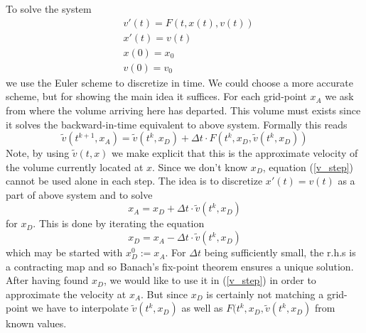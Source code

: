 \documentclass[17pt]{extarticle}
\begin{document}
To solve the system
\begin{align*}
	&v'(t)=F(t,x(t),v(t))\\
	&x'(t)=v(t)\\
	&x(0)=x_0\\
	&v(0)=v_0
\end{align*}
we use the Euler scheme to discretize in time. We could choose a more accurate scheme, but for showing the main idea it suffices. For each grid-point $x_A$ we ask from where the volume arriving here has departed. This volume must exists since it solves the backward-in-time equivalent to above system. Formally this reads
\begin{equation} \label{v_step}
\tilde{v}(t^{k+1}, x_A)=\tilde{v}(t^k, x_D)+\Delta t\cdot F(t^k, x_D, \tilde{v}(t^k, x_D))
\end{equation}
Note, by using $\tilde{v}(t,x)$ we make explicit that this is the approximate velocity of the volume currently located at $x$.
Since we don't know $x_D$, equation (\ref{v_step}) cannot be used alone in each step.
The idea is to discretize $x'(t)=v(t)$ as a part of above system and to solve
\begin{equation}
	x_A=x_D+\Delta t\cdot \tilde{v}(t^k, x_D)
\end{equation} 
for $x_D$.
This is done by iterating the equation
$$
x_D=x_A-\Delta t\cdot \tilde{v}(t^k, x_D)
$$
which may be started with $x_D^0:=x_A$.
For $\Delta t$ being sufficiently small, the r.h.s is a contracting map and so Banach's fix-point theorem ensures a unique solution.
After having found $x_D$, we would like to use it in (\ref{v_step}) in order to approximate the velocity at $x_A$. But since $x_D$ is certainly not matching a grid-point we have to interpolate $\tilde{v}(t^k, x_D)$ as well as $F(t^k, x_D, \tilde{v}(t^k, x_D)$ from known values.
\end{document}
